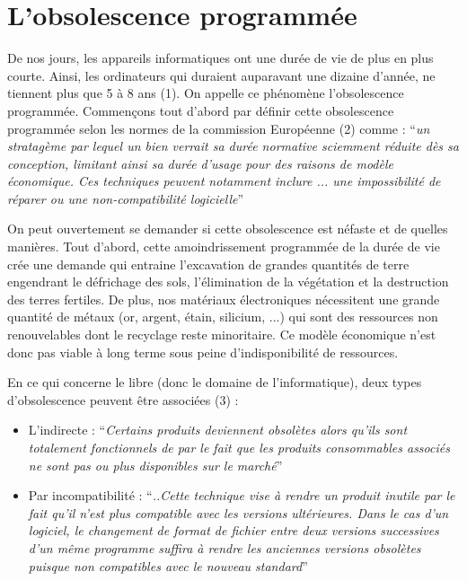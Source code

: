 \documentclass[10pt]{../fiche}
\begin{document}
\section*{L'obsolescence programmée}

De nos jours, les appareils informatiques ont une durée de vie de plus en plus courte. Ainsi, les ordinateurs qui duraient auparavant une dizaine d'année, ne tiennent plus que 5 à 8 ans (1). On appelle ce phénomène l'obsolescence programmée. Commençons tout d'abord par définir  cette obsolescence programmée selon les normes de la commission
Européenne (2) comme :
``\textit{un stratagème par lequel un bien verrait sa durée
normative sciemment réduite dès sa conception, limitant
ainsi sa durée d'usage pour des raisons de modèle économique.
Ces techniques peuvent notamment inclure
... une impossibilité de réparer ou une non-compatibilité
logicielle}''

On peut ouvertement se demander si cette obsolescence est néfaste et de quelles manières. Tout d'abord, cette amoindrissement programmée de la durée de vie crée une demande qui entraine l'excavation de grandes quantités de terre engendrant le défrichage des sols, l'élimination de la végétation et la destruction des terres fertiles. De plus, nos matériaux électroniques nécessitent une grande quantité de métaux (or, argent, étain, silicium, ...) qui sont des ressources non renouvelables dont le recyclage reste minoritaire. Ce modèle économique n'est donc pas viable à long terme sous peine d'indisponibilité de ressources.

En ce qui concerne le libre (donc le domaine de l'informatique), deux types d'obsolescence peuvent être associées (3) :
\begin{itemize}
  \item L'indirecte : ``\textit{Certains produits deviennent obsolètes alors qu'ils sont totalement fonctionnels de par le fait que les produits consommables associés ne sont pas ou plus disponibles sur le marché}''

  \item Par incompatibilité : ``\textit{..Cette technique vise à rendre un produit inutile par le fait qu'il n'est plus compatible
    avec les versions ultérieures. Dans le cas d'un logiciel, le changement de format de fichier entre deux versions successives d'un même programme suffira à rendre les anciennes versions obsolètes puisque non compatibles avec le nouveau standard}''
\end{itemize}
\end{document}
